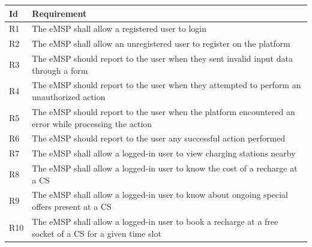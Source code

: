 \documentclass[11pt]{article}
\begin{document}
\begin{table}[H]
    \centering
    \setlength{\tabcolsep}{18pt}
    \renewcommand{\arraystretch}{1.2}
    \begin{tabularx}{\textwidth}{|>{\centering\hsize=0.1\hsize}X|>{\hsize=1.9\hsize}X|}
        \hline
        \textbf{Id} & \textbf{Requirement} \\
        \hline
        R1 & The eMSP shall allow a registered user to login \\
        \hline
        R2 & The eMSP shall allow an unregistered user to register on the platform \\
        \hline
        R3 & The eMSP should report to the user when they sent invalid input data through a form \\
        \hline
        R4 & The eMSP should report to the user when they attempted to perform an unauthorized action \\
        \hline
        R5 & The eMSP should report to the user when the platform encountered an error while processing the action \\
        \hline
        R6 & The eMSP should report to the user any successful action performed \\
        \hline
        R7 & The eMSP shall allow a logged-in user to view charging stations nearby \\
        \hline
        R8 & The eMSP shall allow a logged-in user to know the cost of a recharge at a CS \\
        \hline
        R9 & The eMSP shall allow a logged-in user to know about ongoing special offers present at a CS \\
        \hline
        R10 & The eMSP shall allow a logged-in user to book a recharge at a free socket of a CS for a given time slot \\
        \hline

\end{tabularx}
\end{table}
\end{document}
